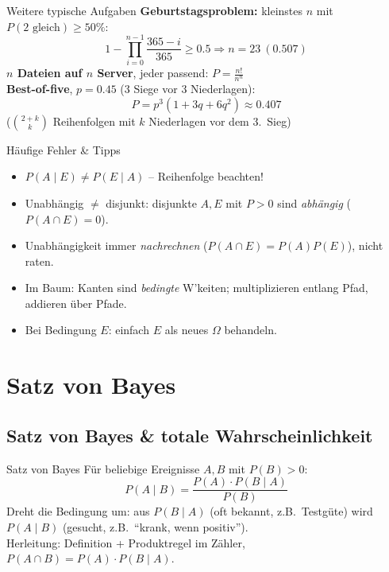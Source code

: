 \documentclass[a4paper, fontsize=7pt]{scrartcl}
\begin{document}
\begin{subbox}{Weitere typische Aufgaben}
\textbf{Geburtstagsproblem:} kleinstes $n$ mit $P(\text{2 gleich}) \ge 50\%$:
$$1 - \prod_{i=0}^{n-1} \frac{365 - i}{365} \ge 0.5 \Rightarrow
\boxed{n = 23}\ (0.507)$$
\textbf{$n$ Dateien auf $n$ Server}, jeder passend:
$P = \frac{n!}{n^n}$\\
\textbf{Best-of-five}, $p = 0.45$ (3 Siege vor 3 Niederlagen):
$$P = p^3\left(1 + 3q + 6q^2\right) \approx 0.407$$
($\binom{2+k}{k}$ Reihenfolgen mit $k$ Niederlagen vor dem 3.\ Sieg)
\end{subbox}

\begin{subbox}{Häufige Fehler \& Tipps}
\begin{itemize}
    \item $P(A \mid E) \neq P(E \mid A)$ -- Reihenfolge beachten!
    \item Unabhängig $\neq$ disjunkt: disjunkte $A, E$ mit $P > 0$ sind
          \emph{abhängig} ($P(A \cap E) = 0$).
    \item Unabhängigkeit immer \emph{nachrechnen}
          ($P(A\cap E) = P(A)P(E)$), nicht raten.
    \item Im Baum: Kanten sind \emph{bedingte} W'keiten; multiplizieren
          entlang Pfad, addieren über Pfade.
    \item Bei Bedingung $E$: einfach $E$ als neues $\Omega$ behandeln.
\end{itemize}
\end{subbox}

\section{Satz von Bayes}

\subsection{Satz von Bayes \& totale Wahrscheinlichkeit}

\begin{mainbox}{Satz von Bayes}
Für beliebige Ereignisse $A, B$ mit $P(B) > 0$:
$$\boxed{P(A \mid B) = \frac{P(A) \cdot P(B \mid A)}{P(B)}}$$
Dreht die Bedingung um: aus $P(B \mid A)$ (oft bekannt, z.B.\
Testgüte) wird $P(A \mid B)$ (gesucht, z.B.\ ``krank, wenn positiv'').\\
Herleitung: Definition + Produktregel im Zähler,
$P(A \cap B) = P(A) \cdot P(B \mid A)$.
\end{mainbox}
\end{document}
